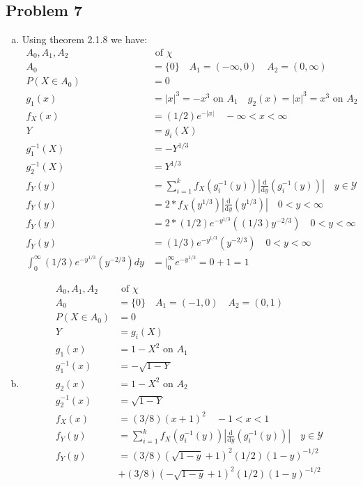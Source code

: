 \documentclass{article}
\newcommand{\yderiv}[1]{\frac{\mathrm{d}}{\mathrm{d}y} (#1)}
\begin{document}
\begin{flushleft}
\section*{Problem 7}
\begin{enumerate}[(a)]
\item 
Using theorem 2.1.8 we have:
\begin{align*}
A_0,A_1,A_2 &\text{ of } \chi\\
A_0&=\{0\} \quad A_1=(-\infty,0) \quad A_2=(0,\infty)\\
P(X \in A_0)&=0\\
g_1(x)&=|x|^3=-x^3 \text{ on } A_1 \quad g_2(x)=|x|^3=x^3 \text{ on } A_2\\
f_X(x)&=(1/2)e^{-|x|} \quad -\infty<x<\infty\\
Y&=g_i(X)\\
g_1^{-1}(X)&=-Y^{1/3}\\
g_2^{-1}(X)&=Y^{1/3}\\
f_Y(y)&=\sum_{i=1}^{k}f_X(g_i^{-1}(y))\left|\yderiv{g_i^{-1}(y)}\right| \quad y \in \mathcal{Y}\\
f_Y(y)&=2*f_X(y^{1/3})\left|\yderiv{y^{1/3}}\right| \quad 0<y<\infty\\
f_Y(y)&=2*(1/2)e^{-y^{1/3}}((1/3)y^{-2/3}) \quad 0<y<\infty\\
f_Y(y)&=(1/3)e^{-y^{1/3}}(y^{-2/3}) \quad 0<y<\infty\\
\int_{0}^{\infty}(1/3)e^{-y^{1/3}}(y^{-2/3}) dy&=\bigg|_{0}^{\infty} e^{-y^{1/3}}=0+1=1
\end{align*}
\item
\begin{align*}
A_0,A_1,A_2 &\text{ of } \chi\\
A_0&=\{0\} \quad A_1=(-1,0) \quad A_2 = (0,1)\\
P(X \in A_0)&=0\\
Y&=g_i(X)\\
g_1(x)&=1-X^2 \text{ on } A_1\\
g_1^{-1}(x)&=-\sqrt{1-Y}\\
g_2(x)&=1-X^2 \text{ on } A_2\\
g_2^{-1}(x)&=\sqrt{1-Y}\\
f_X(x)&=(3/8)(x+1)^2 \quad -1<x<1\\
f_Y(y)&=\sum_{i=1}^{k}f_X(g_i^{-1}(y))\left|\yderiv{g_i^{-1}(y)}\right| \quad y \in \mathcal{Y}\\
f_Y(y)&=(3/8)(\sqrt{1-y}+1)^2(1/2)(1-y)^{-1/2}\\
&+(3/8)(-\sqrt{1-y}+1)^2(1/2)(1-y)^{-1/2}\\

\end{align*}
\end{enumerate}
\end{flushleft}
\end{document}
